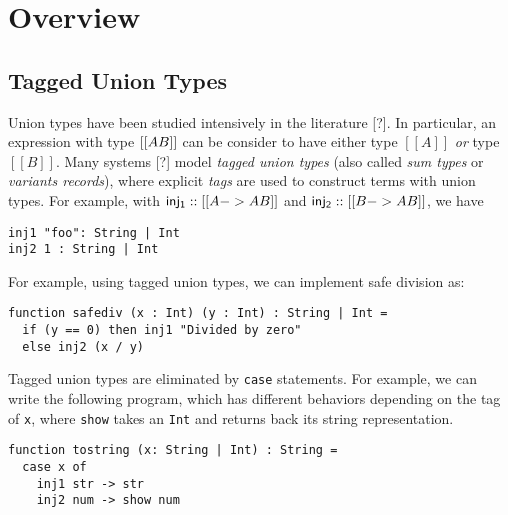 \section{Overview}
\label{sec:overview}


\subsection{Tagged Union Types}



Union types have been studied intensively in the literature [?]. In particular,
an expression with type $[[A\/B]]$ can be consider to have either type $[[A]]$
\textit{or} type $[[B]]$. Many systems [?] model \textit{tagged union types}
(also called \textit{sum types} or \textit{variants records}),
where explicit \textit{tags} are used to construct terms with union types. For
example, with $\mathsf{inj_1} :: [[A -> A \/ B]]$ and $\mathsf{inj_2} :: [[B ->
A \/ B]]$, we have

\begin{lstlisting}
inj1 "foo": String | Int
inj2 1 : String | Int
\end{lstlisting}

For example, using tagged union types, we can implement safe division as:

\begin{lstlisting}
function safediv (x : Int) (y : Int) : String | Int =
  if (y == 0) then inj1 "Divided by zero"
  else inj2 (x / y)
\end{lstlisting}

Tagged union types are eliminated by \lstinline{case} statements. For example,
we can write the following program, which has different behaviors depending on the
tag of \lstinline{x}, where \lstinline{show} takes an \lstinline{Int} and
returns back its string representation.


\begin{lstlisting}
function tostring (x: String | Int) : String =
  case x of
    inj1 str -> str
    inj2 num -> show num
\end{lstlisting}

